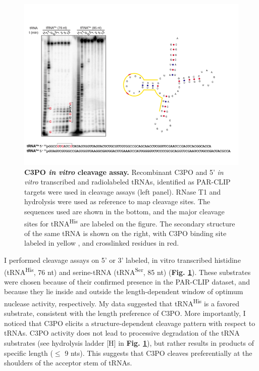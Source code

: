 \documentclass[12pt]{rockefeller}
\newcommand{\super}[1]{\textsuperscript{#1}}
\begin{document}
\begin{figure}[!ht]%
\centering
\includegraphics[width=\textwidth]{cleavage.png} 
\caption[C3PO \textit{in vitro} cleavage assay.]
{
\textbf{C3PO \textit{in vitro} cleavage assay.}
Recombinant C3PO and 5' \textit{in vitro} transcribed and radiolabeled tRNAs, identified as PAR-CLIP targets were used in cleavage assays (left panel). RNase T1 and hydrolysis were used as reference to map cleavage sites. The sequences used are shown in the bottom, and the major cleavage sites for tRNA\super{His} are labeled on the figure. The secondary structure of the same tRNA is shown on the right, with C3PO binding site labeled in yellow , and crosslinked residues in red.
}
\centering
\label{cleavage}%
\end{figure}

I performed cleavage assays on 5’ or 3’ labeled, in vitro transcribed histidine (tRNA\super{His}, 76 nt) and serine-tRNA (tRNA\super{Ser}, 85 nt) (\textbf{Fig. \ref{cleavage}}). These substrates were chosen because of their confirmed presence in the PAR-CLIP dataset, and because they lie inside and outside the length-dependent window of optimum nuclease activity, respectively. My data suggested that tRNA\super{His} is a favored substrate, consistent with the length preference of C3PO. More importantly, I noticed that C3PO elicits a structure-dependent cleavage pattern with respect to tRNAs. C3PO activity does not lead to processive degradation of the tRNA substrates (see hydrolysis ladder [H] in \textbf{Fig. \ref{cleavage}}), but rather results in products of specific length ($\leq$ 9 nts). This suggests that C3PO cleaves preferentially at the shoulders of the acceptor stem of tRNAs.
\end{document}
